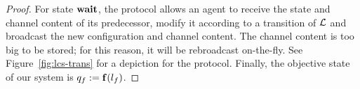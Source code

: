 \begin{proof}
	For state $\mathbf{wait}$, the protocol allows an agent to receive the state and channel content of its predecessor, modify it according to a transition of $\mathcal{L}$ and broadcast the new configuration and channel content. The channel content is too big to be stored; for this reason, it will be rebroadcast on-the-fly. See Figure~\ref{fig:lcs-trans} for a depiction for the protocol. 
	Finally, the objective state of our system is $q_f := \mathbf{f}(l_f)$.



\end{proof}
